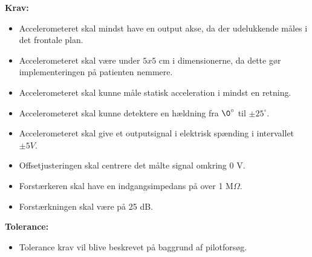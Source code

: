 \textbf{Krav:}
\begin{itemize}
\item Accelerometeret skal mindst have en output akse, da der udelukkende måles i det frontale plan.
\item Accelerometeret skal være under $5x5$ cm i dimensionerne, da dette gør implementeringen på patienten nemmere.
\item Accelerometeret skal kunne måle statisk acceleration i mindst en retning.
\item Accelerometeret skal kunne detektere en hældning fra $\0^{\circ}$ til $\pm 25^{\circ}$.
\item Accelerometeret skal give et outputsignal i elektrisk spænding i intervallet $\pm 5 V$.
\item Offsetjusteringen skal centrere det målte signal omkring 0 V.
\item Forstærkeren skal have en indgangsimpedans på over 1 M$\Omega$. 
\item Forstærkningen skal være på 25 dB.
\end{itemize}
\textbf{Tolerance:}
\begin{itemize}
\item Tolerance krav vil blive beskrevet på baggrund af pilotforsøg.
\end{itemize}
